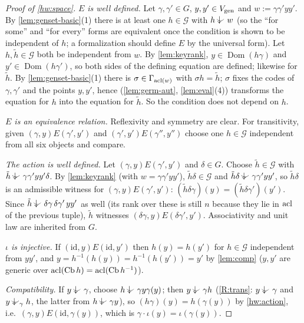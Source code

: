 \begin{proof}[Proof of \ref{hw:space}]
\emph{$E$ is well defined.}  Let $\gamma,\gamma'\in G$, $y,y'\in V_{\operatorname{gen}}$ and
$w:=\gamma\gamma'yy'$.  By \cref{lem:genset-basic}(1) there is at least one $h\in\mathcal G$
with $h\ind{}w$ (so the ``for some'' and ``for every'' forms are equivalent once the
condition is shown to be independent of $h$; a formalization should define $E$ by the
universal form).  Let $h,\tilde h\in\mathcal G$ both be independent from $w$.  By
\cref{lem:keyrank}, $y\in\operatorname{Dom}(h\gamma)$ and $y'\in\operatorname{Dom}(h\gamma')$, so
both sides of the defining equation are defined; likewise for $\tilde h$.  By
\cref{lem:genset-basic}(1) there is $\sigma\in\Gamma_{\operatorname{acl}(w)}$ with $\sigma h=\tilde h$;
$\sigma$ fixes the codes of $\gamma,\gamma'$ and the points $y,y'$, hence (\cref{lem:germ-aut},
\cref{lem:eval}(4)) transforms the equation for $h$ into the equation for $\tilde h$.
So the condition does not depend on $h$.

\emph{$E$ is an equivalence relation.}  Reflexivity and symmetry are clear.  For
transitivity, given $(\gamma,y)E(\gamma',y')$ and $(\gamma',y')E(\gamma'',y'')$ choose one
$h\in\mathcal G$ independent from all six objects and compare.

\emph{The action is well defined.}  Let $(\gamma,y)E(\gamma',y')$ and $\delta\in G$.
Choose $\tilde h\in\mathcal G$ with $\tilde h\ind{}\gamma\gamma'yy'\delta$.  By
\cref{lem:keyrank} (with $w=\gamma\gamma'yy'$), $\tilde h\delta\in\mathcal G$ and
$\tilde h\delta\ind{}\gamma\gamma'yy'$, so $\tilde h\delta$ is an admissible witness for
$(\gamma,y)E(\gamma',y')$: $(\tilde h\delta\gamma)(y)=(\tilde h\delta\gamma')(y')$.  Since
$\tilde h\ind{}\delta\gamma\,\delta\gamma'\,yy'$ as well (its rank over these is still $n$
because they lie in $\operatorname{acl}$ of the previous tuple), $\tilde h$ witnesses
$(\delta\gamma,y)E(\delta\gamma',y')$.  Associativity and unit law are inherited from $G$.

\emph{$\iota$ is injective.}  If $(\mathrm{id},y)E(\mathrm{id},y')$ then $h(y)=h(y')$ for
$h\in\mathcal G$ independent from $yy'$, and $y=h^{-1}(h(y))=h^{-1}(h(y'))=y'$ by
\cref{lem:comp} ($y,y'$ are generic over $\operatorname{acl}(\operatorname{Cb} h)=\operatorname{acl}(\operatorname{Cb} h^{-1})$).

\emph{Compatibility.}  If $y\ind{}\gamma$, choose $h\ind{}\gamma y\gamma(y)$; then
$y\ind{}\gamma h$ (\ref{R:trans}: $y\ind{}\gamma$ and $y\ind{\gamma}h$, the latter from
$h\ind{}\gamma y$), so $(h\gamma)(y)=h(\gamma(y))$ by \ref{hw:action}, i.e.\
$(\gamma,y)E(\mathrm{id},\gamma(y))$, which is $\gamma\cdot\iota(y)=\iota(\gamma(y))$.


\end{proof}
